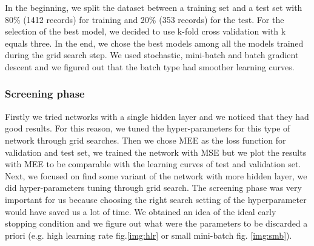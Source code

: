 In the beginning, we split the dataset between a training set and a test set with 80\% (1412 records) for training and 20\% (353 records) for the test. For the selection of the best model, we decided to use k-fold cross validation with k equals three. In the end, we chose the best models among all the models trained during the grid search step. We used stochastic, mini-batch and batch gradient descent and we figured out that the batch type had smoother learning curves.

\subsubsection{Screening phase}

Firstly we tried networks with a single hidden layer and we noticed that they had good results. For this reason, we tuned the hyper-parameters for this type of network through grid searches.
Then we chose MEE as the loss function for validation and test set, we trained the network with MSE but we plot the results with MEE to be comparable with the learning curves of test and validation set.
Next, we focused on find some variant of the network with more hidden layer, we did hyper-parameters tuning through grid search.
The screening phase was very important for us because choosing the right search setting of the hyperparameter would have saved us a lot of time. We obtained an idea of the ideal early stopping condition and we figure out what were the parameters to be discarded a priori (e.g. high learning rate fig.\ref{img:hlr} or small mini-batch fig. \ref{img:smb}).

